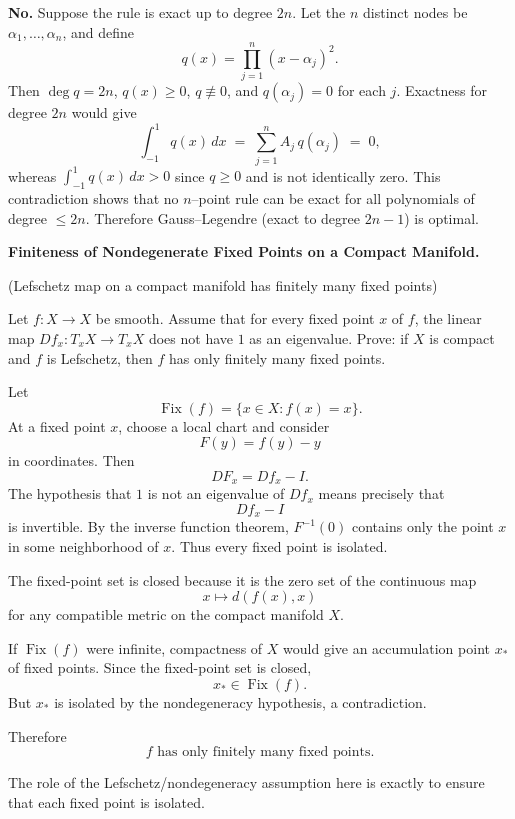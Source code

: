 \begin{solution}
\textbf{No.} Suppose the rule is exact up to degree $2n$. Let the $n$ distinct nodes be $\alpha_1,\dots,\alpha_n$,
	and define
	\[
	q(x)=\prod_{j=1}^n (x-\alpha_j)^2 .
	\]
	Then $\deg q=2n$, $q(x)\ge 0$, $q\not\equiv 0$, and $q(\alpha_j)=0$ for each $j$.
	Exactness for degree $2n$ would give
	\[
	\int_{-1}^{1} q(x)\,dx \;=\; \sum_{j=1}^n A_j\,q(\alpha_j) \;=\; 0,
	\]
	whereas $\int_{-1}^{1} q(x)\,dx>0$ since $q\ge 0$ and is not identically zero. This contradiction shows
	that no $n$--point rule can be exact for all polynomials of degree $\le 2n$.
	Therefore Gauss--Legendre (exact to degree $2n-1$) is optimal.

	\bigskip
\end{solution}

\begin{problem}[CP-II-0238]
\label{prob:cp-ii-0238}
\textbf{Finiteness of Nondegenerate Fixed Points on a Compact Manifold.}

\hspace*{1.5em}(Lefschetz map on a compact manifold has finitely many fixed points)

Let $f:X\to X$ be smooth. Assume that for every fixed point $x$ of $f$,
the linear map $Df_x:T_xX\to T_xX$ does not have $1$ as an eigenvalue.
Prove: if $X$ is compact and $f$ is Lefschetz, then $f$ has only finitely many fixed points.

\medskip
\end{problem}

\begin{solution}
Let
\[
\operatorname{Fix}(f)
=
\{x\in X:f(x)=x\}.
\]
At a fixed point \(x\), choose a local chart and consider
\[
F(y)=f(y)-y
\]
in coordinates. Then
\[
DF_x
=
Df_x-I.
\]
The hypothesis that \(1\) is not an eigenvalue of \(Df_x\) means precisely that
\[
Df_x-I
\]
is invertible. By the inverse function theorem, \(F^{-1}(0)\) contains only the point \(x\)
in some neighborhood of \(x\). Thus every fixed point is isolated.

The fixed-point set is closed because it is the zero set of the continuous map
\[
x\mapsto d(f(x),x)
\]
for any compatible metric on the compact manifold \(X\).

If \(\operatorname{Fix}(f)\) were infinite, compactness of \(X\) would give an accumulation
point \(x_*\) of fixed points. Since the fixed-point set is closed,
\[
x_*\in\operatorname{Fix}(f).
\]
But \(x_*\) is isolated by the nondegeneracy hypothesis, a contradiction.

Therefore
\[
\boxed{
f\text{ has only finitely many fixed points}.
}
\]

The role of the Lefschetz/nondegeneracy assumption here is exactly to ensure that each fixed
point is isolated.
\end{solution}


